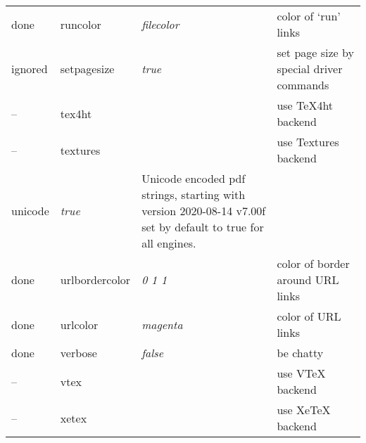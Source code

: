 \begin{longtable}{@{}l>{\ttfamily}llp{7cm}@{}}
done & runcolor           & \textit{filecolor}     & color of `run' links\\
ignored &setpagesize        & \textit{true}          & set page size by special driver commands \\
-- & tex4ht             &                        & use \textsf{\TeX4ht} backend \\
-- & textures           &                        & use \textsf{Textures} backend \\
unicode            & \textit{true}          & Unicode encoded pdf strings, starting with version  2020-08-14 v7.00f set by default to true for all engines. \\
done & urlbordercolor     & \textit{0 1 1}         & color of border around URL links \\
done & urlcolor           & \textit{magenta}       & color of URL links \\
done & verbose            & \textit{false}         & be chatty \\
-- & vtex               &                        & use \textsf{VTeX} backend\\
-- & xetex              &                        & use \textsf{Xe\TeX} backend\\
\end{longtable} 